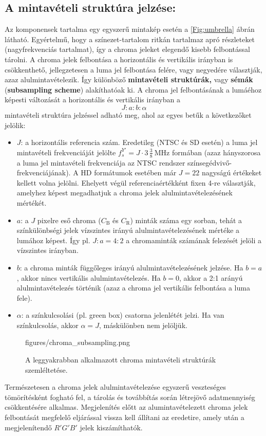 \subsection*{A mintavételi struktúra jelzése:\\}
Az \ycbcr komponensek tartalma egy egyszerű mintakép esetén a \ref{Fig:umbrella} ábrán látható.
Egyértelmű, hogy a színezet-tartalom ritkán tartalmaz apró részleteket (nagyfrekvenciás tartalmat), így a chroma jeleket elegendő kisebb felbontással tárolni.
A chroma jelek felbontása a horizontális és vertikális irányban is csökkenthető, jellegzetesen a luma jel felbontása felére, vagy negyedére választják, azaz alulmintavételezik.
Így különböző \textbf{mintavételi struktúrák,} vagy \textbf{sémák} (\textbf{subsampling scheme}) alakíthatóak ki.
A chroma jel felbontásának a lumáéhoz képesti változását a horizontális és vertikális irányban a
\begin{equation}
J : a : b : \alpha
\end{equation}
mintavételi struktúra jelzéssel adható meg, ahol az egyes betűk a következőket jelölik:
\begin{itemize}
\item $J$: a horizontális referencia szám.
Eredetileg (NTSC és SD esetén) a luma jel mintavételi frekvenciáját jelölte $f^{Y'}_s = J \cdot 3\,\frac{3}{8}~\mathrm{MHz}$ formában (azaz hányszorosa a luma jel mintavételi frekvenciája az NTSC rendszer színsegédvivő-frekvenciájának).
A HD formátumok esetében már $J=22$ nagyságú értékeket kellett volna jelölni.
Ehelyett végül referenciaértékként fixen 4-re választják, amelyhez képest megadhatjuk a chroma jelek alulmintavételezésének mértékét.
\item $a$: a $J$ pixelre eső chroma ($C_{\mathrm{B}}$ és $C_{\mathrm{R}}$) minták száma egy sorban, tehát a színkülönbségi jelek vízszintes irányú alulmintavételezésének mértéke a lumához képest.
Így pl. $J:a= 4:2$ a chromaminták számának felezését jelöli a vízszintes irányban.
\item $b$: a chroma minták függőleges irányú alulmintavételezésének jelzése.
Ha $b = a$, akkor nincs vertikális alulmintavételezés.
Ha $b = 0$, akkor a 2:1 arányú alulmintavételezés történik (azaz a chroma jel vertikális felbontása a luma fele).
\item $\alpha$: a színkulcsolási (pl. green box) csatorna jelenlétét jelzi. 
Ha van színkulcsolás, akkor $\alpha = J$, máskülönben nem jelöljük.
\end{itemize}
\begin{figure}[]
	\centering
	\begin{overpic}[width = 1\columnwidth ]{figures/chroma_subsampling.png}
 	\end{overpic}
	\caption{A leggyakrabban alkalmazott chroma mintavételi struktúrák szemléltetése.}
	\label{Fig:chroma_subsampling}
\end{figure}
Természetesen a chroma jelek alulmintavételezése egyszerű veszteséges tömörítésként fogható fel, a tárolás és továbbítás során létrejövő adatmennyiség csökkentésére alkalmas.
Megjelenítés előtt az alumintavételezett chroma jelek felbontását megfelelő eljárással vissza kell állítani az eredetire, amely után a megjelenítendő $R'G'B'$ jelek kiszámíthatók.

